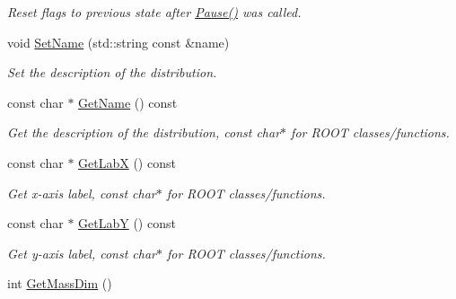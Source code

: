 \begin{DoxyCompactItemize}
\begin{DoxyCompactList}\small\item\em Reset flags to previous state after \hyperlink{classHistArray_a27f9acb7029ec4c90b4476e5bc26037d}{Pause()} was called. \end{DoxyCompactList}\item 
\hypertarget{classHistArray_af40b91f1863ab8e68bdf2ac11e8f9767}{}void \hyperlink{classHistArray_af40b91f1863ab8e68bdf2ac11e8f9767}{Set\+Name} (std\+::string const \&name)\label{classHistArray_af40b91f1863ab8e68bdf2ac11e8f9767}

\begin{DoxyCompactList}\small\item\em Set the description of the distribution. \end{DoxyCompactList}\item 
\hypertarget{classHistArray_ad893a01d5a59715e33ce2a67b316f9e1}{}const char $\ast$ \hyperlink{classHistArray_ad893a01d5a59715e33ce2a67b316f9e1}{Get\+Name} () const \label{classHistArray_ad893a01d5a59715e33ce2a67b316f9e1}

\begin{DoxyCompactList}\small\item\em Get the description of the distribution, const char$\ast$ for R\+O\+O\+T classes/functions. \end{DoxyCompactList}\item 
\hypertarget{classHistArray_a0e41187ec5f353409d7ad4e0208973f9}{}const char $\ast$ \hyperlink{classHistArray_a0e41187ec5f353409d7ad4e0208973f9}{Get\+Lab\+X} () const \label{classHistArray_a0e41187ec5f353409d7ad4e0208973f9}

\begin{DoxyCompactList}\small\item\em Get x-\/axis label, const char$\ast$ for R\+O\+O\+T classes/functions. \end{DoxyCompactList}\item 
\hypertarget{classHistArray_a2ebf036d68aec59b36d02768d2909b90}{}const char $\ast$ \hyperlink{classHistArray_a2ebf036d68aec59b36d02768d2909b90}{Get\+Lab\+Y} () const \label{classHistArray_a2ebf036d68aec59b36d02768d2909b90}

\begin{DoxyCompactList}\small\item\em Get y-\/axis label, const char$\ast$ for R\+O\+O\+T classes/functions. \end{DoxyCompactList}\item 
\hypertarget{classHistArray_aa2f028b5c80394b8e5a449c137d43f63}{}int \hyperlink{classHistArray_aa2f028b5c80394b8e5a449c137d43f63}{Get\+Mass\+Dim} ()\label{classHistArray_aa2f028b5c80394b8e5a449c137d43f63}


\end{DoxyCompactItemize}
